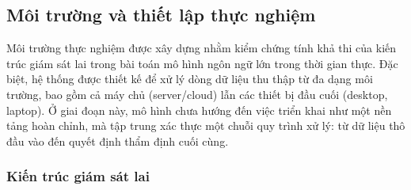 \subsection{Môi trường và thiết lập thực nghiệm}
Môi trường thực nghiệm được xây dựng nhằm kiểm chứng tính khả thi của kiến trúc giám sát lai trong bài toán mô hình ngôn ngữ lớn trong thời gian thực. Đặc biệt, hệ thống được thiết kế để xử lý dòng dữ liệu thu thập từ đa dạng môi trường, bao gồm cả máy chủ (server/cloud) lẫn các thiết bị đầu cuối (desktop, laptop). Ở giai đoạn này, mô hình chưa hướng đến việc triển khai như một nền tảng hoàn chỉnh, mà tập trung xác thực một chuỗi quy trình xử lý: từ dữ liệu thô đầu vào đến quyết định thẩm định cuối cùng.

\subsubsection{Kiến trúc giám sát lai}
